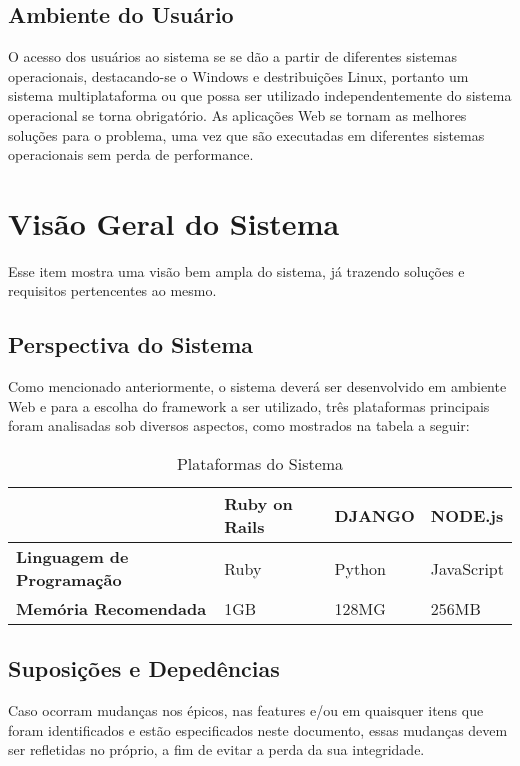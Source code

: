 \subsection{Ambiente do Usuário}

O acesso dos usuários ao sistema se se dão a partir de diferentes sistemas operacionais, destacando-se o Windows e destribuições Linux, portanto um sistema multiplataforma ou que possa ser utilizado independentemente do sistema operacional se torna obrigatório. As aplicações Web se tornam as melhores soluções para o problema, uma vez que são executadas em diferentes sistemas operacionais sem perda de performance.

\section{Visão Geral do Sistema}

Esse item mostra uma visão bem ampla do sistema, já trazendo soluções e requisitos pertencentes ao mesmo.

\subsection{Perspectiva do Sistema}

Como mencionado anteriormente, o sistema deverá ser desenvolvido em ambiente Web e para a escolha do framework a ser utilizado, três plataformas principais foram analisadas sob diversos aspectos, como mostrados na tabela a seguir:

\begin{table}[H]
\begin{tabular}{| >{\centering}m{4cm}<{\centering} | >{\centering}m{4cm}<{\centering} | >{\centering}m{4cm}<{\centering} | >{\centering}m{4cm}<{\centering} |}
	\hline
	& \textbf{Ruby on Rails} & \textbf{DJANGO} & \textbf{NODE.js}\tabularnewline
	\hline
	\textbf{Linguagem de Programação} & Ruby & Python & JavaScript\tabularnewline
	\hline
	\textbf{Memória Recomendada} & 1GB & 128MG & 256MB\tabularnewline
	\hline
\end{tabular}
\caption{Plataformas do Sistema}
\label{Plataformas_do_Sistema}
\end{table}

\subsection{Suposições e Depedências}

Caso ocorram mudanças nos épicos, nas features e/ou em quaisquer itens que foram identificados e estão especificados neste documento, essas mudanças devem ser refletidas no próprio, a fim de evitar a perda da sua integridade.

